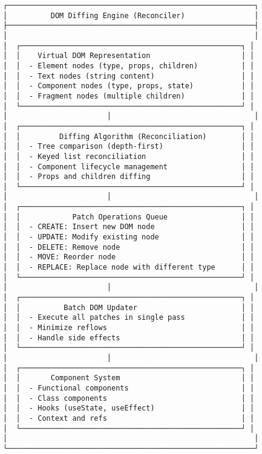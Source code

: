 \documentclass[11pt]{article}
\begin{document}
\begin{verbatim}
┌─────────────────────────────────────────────────────────┐
│          DOM Diffing Engine (Reconciler)                │
├─────────────────────────────────────────────────────────┤
│                                                         │
│  ┌───────────────────────────────────────────────────┐ │
│  │    Virtual DOM Representation                     │ │
│  │  - Element nodes (type, props, children)          │ │
│  │  - Text nodes (string content)                    │ │
│  │  - Component nodes (type, props, state)           │ │
│  │  - Fragment nodes (multiple children)             │ │
│  └───────────────────────────────────────────────────┘ │
│                       │                                 │
│  ┌───────────────────────────────────────────────────┐ │
│  │         Diffing Algorithm (Reconciliation)        │ │
│  │  - Tree comparison (depth-first)                  │ │
│  │  - Keyed list reconciliation                      │ │
│  │  - Component lifecycle management                 │ │
│  │  - Props and children diffing                     │ │
│  └───────────────────────────────────────────────────┘ │
│                       │                                 │
│  ┌───────────────────────────────────────────────────┐ │
│  │            Patch Operations Queue                 │ │
│  │  - CREATE: Insert new DOM node                    │ │
│  │  - UPDATE: Modify existing node                   │ │
│  │  - DELETE: Remove node                            │ │
│  │  - MOVE: Reorder node                             │ │
│  │  - REPLACE: Replace node with different type      │ │
│  └───────────────────────────────────────────────────┘ │
│                       │                                 │
│  ┌───────────────────────────────────────────────────┐ │
│  │          Batch DOM Updater                        │ │
│  │  - Execute all patches in single pass             │ │
│  │  - Minimize reflows                               │ │
│  │  - Handle side effects                            │ │
│  └───────────────────────────────────────────────────┘ │
│                       │                                 │
│  ┌───────────────────────────────────────────────────┐ │
│  │       Component System                            │ │
│  │  - Functional components                          │ │
│  │  - Class components                               │ │
│  │  - Hooks (useState, useEffect)                    │ │
│  │  - Context and refs                               │ │
│  └───────────────────────────────────────────────────┘ │
│                                                         │
└─────────────────────────────────────────────────────────┘
\end{verbatim}
\end{document}
